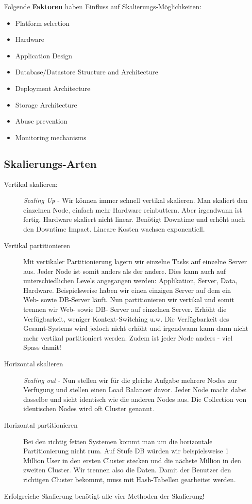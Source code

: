 Folgende \textbf{Faktoren} haben Einfluss auf Skalierungs-Möglichkeiten:
\begin{itemize}
	\item Platform selection
	\item Hardware
	\item Application Design
	\item Database/Datastore Structure and Architecture
	\item Deployment Architecture
	\item Storage Architecture
	\item Abuse prevention
	\item Monitoring mechanisms
\end{itemize}

\subsection{Skalierungs-Arten}
\begin{description}
	\item[Vertikal skalieren:] \emph{Scaling Up} - Wir können immer schnell vertikal skalieren. Man skaliert den einzelnen Node, einfach mehr Hardware reinbuttern. Aber irgendwann ist fertig. Hardware skaliert nicht linear. Benötigt Downtime und erhöht auch den Downtime Impact. Lineare Kosten wachsen exponentiell.
	
	\item[Vertikal partitionieren] Mit vertikaler Partitionierung lagern wir einzelne Tasks auf einzelne Server aus. Jeder Node ist somit anders als der andere. Dies kann auch auf unterschiedlichen Levels angegangen werden: Applikation, Server, Data, Hardware.
	Beispielsweise haben wir einen einzigen Server auf dem ein Web- sowie DB-Server läuft. Nun partitionieren wir vertikal und somit trennen wir Web- sowie DB- Server auf einzelnen Server. Erhöht die Verfügbarkeit, weniger Kontext-Switching u.w. Die Verfügbarkeit des Gesamt-Systems wird jedoch nicht erhöht und irgendwann kann dann nicht mehr vertikal partitioniert werden. Zudem ist jeder Node anders - viel Spass damit!
	
	\item[Horizontal skalieren] \emph{Scaling out} - Nun stellen wir für die gleiche Aufgabe mehrere Nodes zur Verfügung und stellen einen Load Balancer davor. Jeder Node macht dabei dasselbe und sieht identisch wie die anderen Nodes aus. Die Collection von identischen Nodes wird oft Cluster genannt.
	
	\item[Horizontal partitionieren] Bei den richtig fetten Systemen kommt man um die horizontale Partitionierung nicht rum. Auf Stufe DB würden wir beispielsweise 1 Million User in den ersten Cluster stecken und die nächste Million in den zweiten Cluster. Wir trennen also die Daten. Damit der Benutzer den richtigen Cluster bekommt, muss mit Hash-Tabellen gearbeitet werden.
\end{description}
Erfolgreiche Skalierung benötigt alle vier Methoden der Skalierung! 

